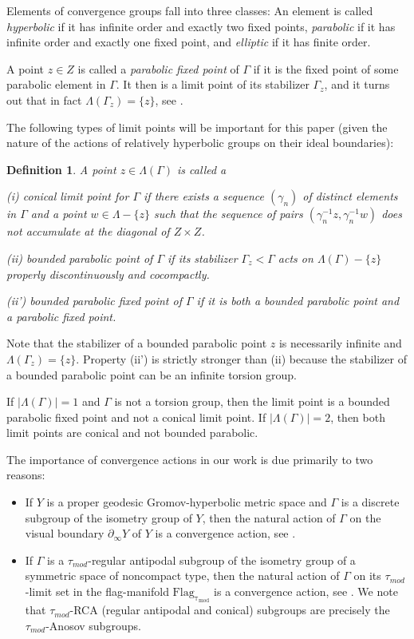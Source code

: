 \documentclass[12pt]{article}
\theoremstyle{boldplain}
\theoremstyle{bolddefinition}
\newtheorem{dfn}[equation]{Definition}
\numberwithin{equation}{section}
\def\ga{\gamma}
\def\Ga{\Gamma}
\def\La{\Lambda}
\def\Flagt{\operatorname{Flag_{\tau_{mod}}}}
\def\geo{\partial_{\infty}}
\def\LaGa{\Lambda(\Gamma)}
\def\taumod{\tau_{mod}}
\begin{document}
Elements of convergence groups fall into three classes:
An element is called {\em hyperbolic} if it has infinite order and exactly two fixed points,
{\em parabolic} if it has infinite order and exactly one fixed point,
and {\em elliptic} if it has finite order. 

A point $z\in Z$ is called a {\em parabolic fixed point} of $\Ga$ 
if it is the fixed point of some parabolic element in $\Ga$.
It then is a limit point of its stabilizer $\Ga_z$,
and it turns out that in fact $\La(\Ga_z)=\{z\}$, see \cite[Lemma 2F]{Tukia1994}.

The following types of limit points will be important for this paper
(given the nature of the actions of relatively hyperbolic groups on their ideal boundaries):

\begin{dfn}
\label{dfn:conlimbddpar}
A point $z\in \LaGa$ is called a 

(i) 
{\em conical limit point} for $\Ga$ 
if there exists a sequence $(\ga_n)$ of distinct elements in $\Ga$ 
and a point $w\in \La-\{z\}$ 
such that the sequence of pairs $(\ga_n^{-1} z, \ga_n^{-1} w)$ 
does not accumulate at the diagonal of $Z\times Z$. 

(ii) 
{\em bounded parabolic point} of $\Ga$ 
if its stabilizer $\Ga_z<\Ga$ acts on $\La(\Ga)- \{z\}$ properly discontinuously and cocompactly. 

(ii') 
{\em bounded parabolic fixed point} of $\Ga$ 
if it is both a bounded parabolic point and a parabolic fixed point.
\end{dfn}

Note that the stabilizer of a bounded parabolic point $z$ is necessarily infinite and $\La(\Ga_z)=\{z\}$.
Property (ii') is strictly stronger than (ii) 
because the stabilizer of a bounded parabolic point can be an infinite torsion group.

If $|\La(\Ga)|=1$ and $\Ga$ is not a torsion group,
then the limit point is a bounded parabolic fixed point
and not a conical limit point.
If $|\La(\Ga)|=2$, then both limit points are conical and not bounded parabolic.




The importance of convergence actions in our work is due primarily to two reasons:

\begin{itemize}
\item If $Y$ is a proper geodesic Gromov-hyperbolic metric space and $\Ga$ is a discrete subgroup of the isometry group of $Y$, then the natural action of $\Ga$  on the visual boundary $\geo Y$ of $Y$ is a convergence action, see \cite{Tukia1994}. 

\item If $\Ga$ is a $\taumod$-regular antipodal subgroup of the isometry group of a symmetric space of noncompact type, then the natural action of $\Ga$ on its $\taumod$-limit set in the flag-manifold 
$\Flagt$ is a convergence action, see \cite{anolec}. We  note that $\taumod$-RCA (regular antipodal and conical) subgroups are precisely the $\taumod$-Anosov subgroups. 

\end{itemize} 
\end{document}
